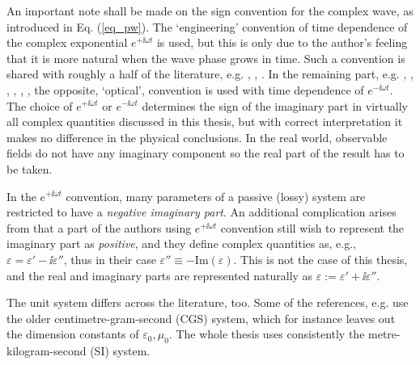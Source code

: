 An important note shall be made on the sign convention for the complex wave, as introduced in Eq. (\ref{eq_pw}).
The `engineering' convention of time dependence of the complex exponential $e^{+\ii \omega t}$ is used, but this is only due to the author's feeling that it is more natural when the wave phase grows in time. Such a convention is shared with roughly a half of the literature, e.g. \cite[p. 9]{engheta2006book}, \cite[pp. 21 and 99]{krowne2007book}, \cite[Chapters 1-4, 6, 9 and 10]{eleftheriades2005book}.  In the remaining part, e.g. \cite[chapters 5, 7, 8]{eleftheriades2005book}, \cite{klingshirn2007semiconductor}, \cite{jackson1962book}, \cite{veselago1968}, \cite{born1999book}, \cite[p. 5]{noginov2011book}, the opposite, `optical', convention is used with time dependence of $e^{-\ii \omega t}$. The choice of $e^{+\ii\omega t}$ or $e^{-\ii\omega t}$ determines the sign of the imaginary part in virtually all complex quantities discussed in this thesis, but with correct interpretation it makes no difference in the physical conclusions.
In the real world, observable fields do not have any imaginary component so the real part of the result has to be taken. 

In the $e^{+\ii\omega t}$ convention, many parameters of a passive (lossy) system are restricted to have a \textit{negative imaginary part}. An additional complication arises from that a part of the authors using $e^{+\ii\omega t}$ convention still wish to represent the imaginary part as \textit{positive}, and they define complex quantities as, e.g., $\varepsilon = \varepsilon' - \ii \varepsilon''$, %
thus in their case $\varepsilon''\equiv -\text{Im}(\varepsilon)$. This is not the case of this thesis, and the real and imaginary parts are represented naturally as $\varepsilon := \varepsilon' + \ii \varepsilon''$.

The unit system differs across the literature, too. Some of the references, e.g. \cite{landau1984electrodynamics, agranovich2006spatial, krowne2007book_agran} use the older centimetre-gram-second (CGS) system, which for instance leaves out the dimension constants of $\varepsilon_0, \mu_0$. The whole thesis uses consistently the metre-kilogram-second (SI) system.

